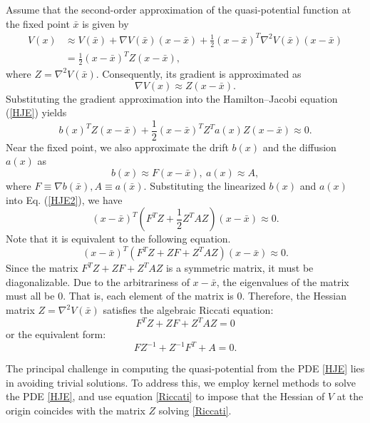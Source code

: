 \documentclass[11pt]{article}
\theoremstyle{plain}      %
\theoremstyle{definition} %
\begin{document}
Assume that the second-order approximation of the quasi-potential function at the fixed point \( \bar{x} \) is given by
\[
\begin{aligned}
V(x) & \approx V(\bar{x}) + \nabla V(\bar{x}) (x - \bar{x}) + \frac{1}{2} (x - \bar{x})^T \nabla^2 V(\bar{x}) (x - \bar{x}) \\
& = \frac{1}{2} (x - \bar{x})^T Z (x - \bar{x}),
\end{aligned}
\]
where \( Z = \nabla^2 V(\bar{x}) \). Consequently, its gradient is approximated as
\[
\nabla V(x) \approx Z (x - \bar{x}).
\]
Substituting the gradient approximation into the Hamilton--Jacobi equation (\ref{HJE}) yields
\begin{equation}\label{HJE2}
b(x)^T Z (x - \bar{x}) + \frac{1}{2} (x - \bar{x})^T Z^T a(x) Z (x - \bar{x}) \approx 0.
\end{equation}
Near the fixed point, we also approximate the drift $b(x)$ and the diffusion $a(x)$ as
\[
b(x) \approx F(x-\bar{x}), \ a(x) \approx A,
\]
where $F \equiv \nabla b(\bar{x}), A \equiv a(\bar{x})$. Substituting the linearized $b(x)$ and $a(x)$ into Eq. (\ref{HJE2}), we have
\begin{equation}\label{HJE3}
(x - \bar{x})^T (F^TZ + \frac{1}{2} Z^TAZ) (x - \bar{x}) \approx 0.
\end{equation}
Note that it is equivalent to the following equation.
\begin{equation}\label{HJE4}
(x - \bar{x})^T (F^TZ + ZF + Z^TAZ) (x - \bar{x}) \approx 0.
\end{equation}
Since the matrix $F^TZ + ZF + Z^TAZ$ is a symmetric matrix, it must be diagonalizable. Due to the arbitrariness of $x - \bar{x}$, the eigenvalues of the matrix must all be 0. That is, each element of the matrix is 0. Therefore, the Hessian matrix \( Z = \nabla^2 V(\bar{x}) \) satisfies the algebraic Riccati equation:
\begin{equation}\label{HJE5}
 F^TZ + ZF + Z^TAZ= 0
\end{equation}
or the equivalent form:
\begin{equation}
\label{Riccati}
FZ^{-1} + Z^{-1}F^T + A = 0.
\end{equation}

The principal challenge in computing the quasi-potential from the PDE \eqref{HJE} lies in avoiding trivial solutions. To address this, we employ kernel methods to solve the PDE \eqref{HJE}, and use equation \eqref{Riccati} to impose that the Hessian of \( V \) at the origin coincides with the matrix \( Z \) solving \eqref{Riccati}.
\end{document}
